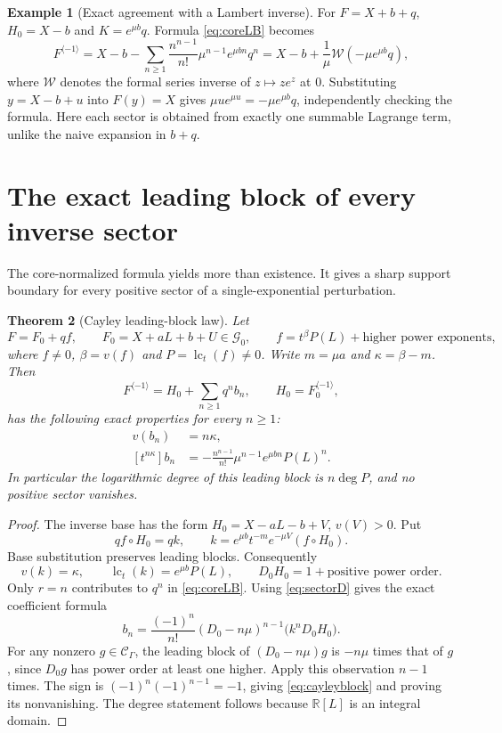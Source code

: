 \documentclass[11pt,a4paper]{article}
\newtheorem{theorem}{Theorem}[section]
\theoremstyle{definition}
\newtheorem{example}[theorem]{Example}
\theoremstyle{remark}
\newcommand{\R}{\mathbb R}
\newcommand{\C}{\mathcal C_\Gamma}
\newcommand{\lc}{\operatorname{lc}_t}
\newcommand{\rev}{^{\langle-1\rangle}}
\begin{document}
\begin{example}[Exact agreement with a Lambert inverse]
For $F=X+b+q$, $H_0=X-b$ and $K=e^{\mu b}q$. Formula
\eqref{eq:coreLB} becomes
\begin{equation}\label{eq:shiftW}
 F\rev=X-b-
 \sum_{n\ge1}\frac{n^{n-1}}{n!}\mu^{n-1}e^{\mu bn}q^n
 =X-b+\frac1\mu\mathcal W(-\mu e^{\mu b}q),
\end{equation}
where $\mathcal W$ denotes the formal series inverse of $z\mapsto ze^z$ at
$0$. Substituting $y=X-b+u$ into $F(y)=X$ gives
$\mu u e^{\mu u}=-\mu e^{\mu b}q$, independently checking the formula.
Here each sector is obtained from exactly one summable Lagrange term,
unlike the naive expansion in $b+q$.
\end{example}

\section{The exact leading block of every inverse sector}
\label{sec:frontier}

The core-normalized formula yields more than existence. It gives a sharp
support boundary for every positive sector of a single-exponential
perturbation.

\begin{theorem}[Cayley leading-block law]\label{thm:cayley}
Let
\[
 F=F_0+qf,\qquad
 F_0=X+aL+b+U\in\mathcal G_0,\qquad
 f=t^\beta P(L)+\text{higher power exponents},
\]
where $f\ne0$, $\beta=v(f)$ and $P=\lc(f)\ne0$.
Write $m=\mu a$ and $\kappa=\beta-m$. Then
\[
 F\rev=H_0+\sum_{n\ge1}q^n b_n,\qquad H_0=F_0\rev,
\]
has the following exact properties for every $n\ge1$:
\begin{align}
 v(b_n)&=n\kappa,\label{eq:cayleyv}\\
 [t^{n\kappa}]b_n
 &=-\frac{n^{n-1}}{n!}\mu^{n-1}e^{\mu bn}P(L)^n.
 \label{eq:cayleyblock}
\end{align}
In particular the logarithmic degree of this leading block is
$n\deg P$, and no positive sector vanishes.
\end{theorem}
\begin{proof}
The inverse base has the form
$H_0=X-aL-b+V$, $v(V)>0$. Put
\[
 qf\circ H_0=qk,
 \qquad
 k=e^{\mu b}t^{-m}e^{-\mu V}(f\circ H_0).
\]
Base substitution preserves leading blocks. Consequently
\[
 v(k)=\kappa,\qquad \lc(k)=e^{\mu b}P(L),\qquad
 D_0H_0=1+\text{positive power order}.
\]
Only $r=n$ contributes to $q^n$ in \eqref{eq:coreLB}. Using
\eqref{eq:sectorD} gives the exact coefficient formula
\begin{equation}\label{eq:bnoperator}
 b_n=\frac{(-1)^n}{n!}(D_0-n\mu)^{n-1}
       \bigl(k^nD_0H_0\bigr).
\end{equation}
For any nonzero $g\in\C$, the leading block of $(D_0-n\mu)g$ is
$-n\mu$ times that of $g$, since $D_0g$ has power order at least one higher.
Apply this observation $n-1$ times. The sign is
$(-1)^n(-1)^{n-1}=-1$, giving \eqref{eq:cayleyblock} and proving its
nonvanishing. The degree statement follows because $\R[L]$ is an integral
domain.
\end{proof}
\end{document}
